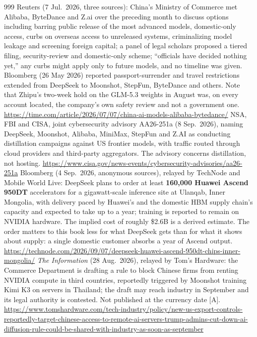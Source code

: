 \begin{thebibliography}{999}
 Reuters (7 Jul.\ 2026, three sources): China's Ministry of Commerce met Alibaba, ByteDance and Z.ai over the preceding month to discuss options including barring public release of the most advanced models, domestic-only access, curbs on overseas access to unreleased systems, criminalizing model leakage and screening foreign capital; a panel of legal scholars proposed a tiered filing, security-review and domestic-only scheme; ``officials have decided nothing yet,'' any curbs might apply only to future models, and no timeline was given. Bloomberg (26 May 2026) reported passport-surrender and travel restrictions extended from DeepSeek to Moonshot, StepFun, ByteDance and others. Note that Zhipu's two-week hold on the GLM-5.3 weights in August was, on every account located, the company's own safety review and not a government one. \url{https://time.com/article/2026/07/07/china-ai-models-alibaba-bytedance/}
 NSA, FBI and CISA, joint cybersecurity advisory AA26-251a (8 Sep.\ 2026), naming DeepSeek, Moonshot, Alibaba, MiniMax, StepFun and Z.AI as conducting distillation campaigns against US frontier models, with traffic routed through cloud providers and third-party aggregators. The advisory concerns distillation, not hosting. \url{https://www.cisa.gov/news-events/cybersecurity-advisories/aa26-251a}
 Bloomberg (4 Sep.\ 2026, anonymous sources), relayed by TechNode and Mobile World Live: DeepSeek plans to order at least \textbf{160{,}000 Huawei Ascend 950DT} accelerators for a gigawatt-scale inference site at Ulanqab, Inner Mongolia, with delivery paced by Huawei's and the domestic HBM supply chain's capacity and expected to take up to a year; training is reported to remain on NVIDIA hardware. The implied cost of roughly \$2.6B is a derived estimate. The order matters to this book less for what DeepSeek gets than for what it shows about supply: a single domestic customer absorbs a year of Ascend output. \url{https://technode.com/2026/09/07/deepseek-huawei-ascend-950dt-chips-inner-mongolia/}
 \emph{The Information} (28 Aug.\ 2026), relayed by Tom's Hardware: the Commerce Department is drafting a rule to block Chinese firms from renting NVIDIA compute in third countries, reportedly triggered by Moonshot training Kimi K3 on servers in Thailand; the draft may reach industry in September and its legal authority is contested. Not published at the currency date [A]. \url{https://www.tomshardware.com/tech-industry/policy/new-us-export-controls-reportedly-target-chinese-access-to-remote-ai-servers-trump-admins-cut-down-ai-diffusion-rule-could-be-shared-with-industry-as-soon-as-september}

\end{thebibliography}
